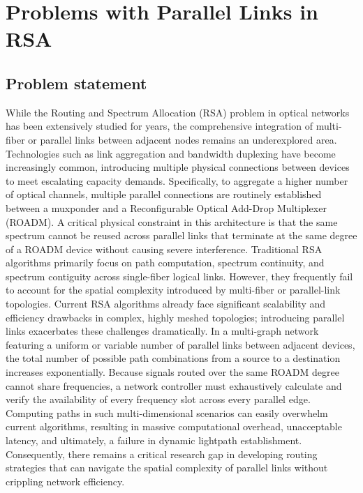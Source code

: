\section{Problems with Parallel Links in RSA}
\subsection{Problem statement}
While the Routing and Spectrum Allocation (RSA) problem in optical networks has been extensively studied for years, the comprehensive integration of multi-fiber or parallel links between adjacent nodes remains an underexplored area. Technologies such as link aggregation and bandwidth duplexing have become increasingly common, introducing multiple physical connections between devices to meet escalating capacity demands. Specifically, to aggregate a higher number of optical channels, multiple parallel connections are routinely established between a muxponder and a Reconfigurable Optical Add-Drop Multiplexer (ROADM). A critical physical constraint in this architecture is that the same spectrum cannot be reused across parallel links that terminate at the same degree of a ROADM device without causing severe interference. Traditional RSA algorithms primarily focus on path computation, spectrum continuity, and spectrum contiguity across single-fiber logical links. However, they frequently fail to account for the spatial complexity introduced by multi-fiber or parallel-link topologies. Current RSA algorithms already face significant scalability and efficiency drawbacks in complex, highly meshed topologies; introducing parallel links exacerbates these challenges dramatically. In a multi-graph network featuring a uniform or variable number of parallel links between adjacent devices, the total number of possible path combinations from a source to a destination increases exponentially. Because signals routed over the same ROADM degree cannot share frequencies, a network controller must exhaustively calculate and verify the availability of every frequency slot across every parallel edge. Computing paths in such multi-dimensional scenarios can easily overwhelm current algorithms, resulting in massive computational overhead, unacceptable latency, and ultimately, a failure in dynamic lightpath establishment. Consequently, there remains a critical research gap in developing routing strategies that can navigate the spatial complexity of parallel links without crippling network efficiency.
